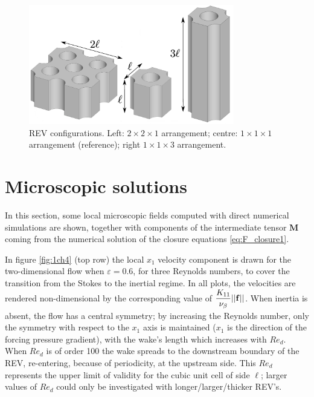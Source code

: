 \begin{figure}[h!]
	\centering
	\includegraphics[width=0.8\textwidth]{chapter_4/figure/multiple}
	\caption{REV configurations. Left: $2 \times 2 \times 1$ arrangement; centre: $1 \times 1 \times 1$ arrangement (reference);  right $1 \times 1 \times 3$ arrangement.}
	\label{fig:multiple}
\end{figure}



\section{Microscopic solutions}

In this section, some local microscopic fields computed with direct numerical simulations are shown, together with components of the intermediate tensor $\mathbf{M}$ coming from the numerical solution of the closure equations \eqref{eq:F_closure1}. 

In figure \ref{fig:1ch4} (top row) the local $x_1$ velocity component is drawn for the two-dimensional flow when $\varepsilon=0.6$, for three 
Reynolds numbers, to cover the transition from the Stokes to the inertial regime. In all plots, the velocities are rendered non-dimensional by
the corresponding value of 
$\displaystyle{\frac{K_{11}}{\nu_{\beta}} ||\bf{f}||}$. When inertia is absent, the flow has a central symmetry; by increasing the Reynolds number, only the 
symmetry with respect to the $x_1$ axis is maintained ($x_1$ is the direction of the forcing pressure gradient), with the wake's length which 
increases with $Re_d$. When $Re_d$ is of order 100 the wake spreads to the downstream boundary of the REV, re-entering, because of periodicity, 
at the upstream side.	This $Re_d$  represents the upper limit of validity for the cubic unit cell of side $\ell$; larger values of $Re_d$ 
could only be investigated with longer/larger/thicker REV's.

